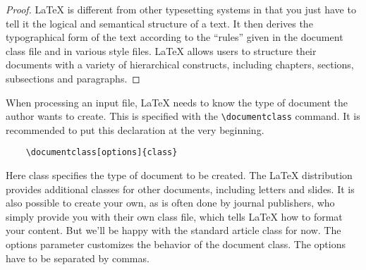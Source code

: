 \documentclass[11pt, letterpaper]{homework}
\begin{document}
\begin{solution}
\begin{proof}
\LaTeX{} is different from other typesetting systems in that you just have to tell it the logical and semantical structure of a text. It then derives the typographical form of the text according to the “rules” given in the document class file and in various style files. \LaTeX{} allows users to structure their documents with a variety of hierarchical constructs, including chapters, sections, subsections and paragraphs.
\end{proof}
\end{solution}

\begin{problem}[Problem 3:]
When processing an input file, LaTeX needs to know the type of document the author wants to create. This is specified with the \verb|\documentclass| command. It is recommended to put this declaration at the very beginning.

\begin{verbatim}
    \documentclass[options]{class}
\end{verbatim}
\end{problem}

\begin{solution}
Here class specifies the type of document to be created. The \LaTeX{} distribution provides additional classes for other documents, including letters and slides. It is also possible to create your own, as is often done by journal publishers, who simply provide you with their own class file, which tells \LaTeX{} how to format your content. But we'll be happy with the standard article class for now. The options parameter customizes the behavior of the document class. The options have to be separated by commas.
\end{solution}
\end{document}
